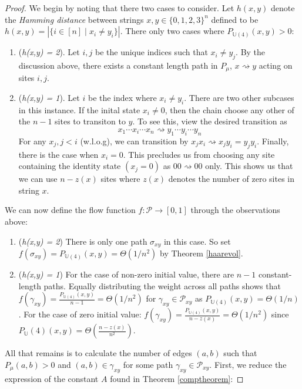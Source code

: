 \documentclass[12pt]{amsart}
\theoremstyle{definition}
\theoremstyle{remark}
\numberwithin{equation}{section}
\theoremstyle{remark}
\begin{document}
\begin{proof}
  We begin by noting that there two cases to consider. Let $h(x,y)$ denote the \emph{Hamming distance} between strings $x,y \in \{0,1,2,3\}^n$ defined to be $h(x,y) = |\{i \in [n] \mid x_i \neq y_i\}|$. There only two cases where $P_{\mathbb{U}(4)}(x,y) > 0$: \newline
  \begin{enumerate}
    \item (\emph{h(x,y) = 2}). Let $i,j$ be the unique indices such that $x_i \neq y_j$. By the discussion above, there exists a constant length path in $P_\mu$, $x \rightsquigarrow y$ acting on sites $i,j$.
    \item (\emph{h(x,y) = 1}). Let $i$ be the index where $x_i \neq y_i$. There are two other subcases in this instance. If the inital state $x_i \neq 0$, then the chain choose any other of the $n-1$ sites to transiton to $y$. To see this, view the desired transition as
    $$x_1 \cdots x_i \cdots x_n \rightsquigarrow y_1 \cdots y_i \cdots y_n$$
    For any $x_j, j < i$ (w.l.o.g), we can transition by $x_jx_i \rightsquigarrow x_jy_i = y_jy_i$. Finally, there is the case when $x_i = 0$. This precludes us from choosing any site containing the identity state $(x_j = 0)$ as $00 \rightsquigarrow 00$ only. This shows us that we can use $n - z(x)$ sites where $z(x)$ denotes the number of zero sites in string $x$.
  \end{enumerate}
  We can now define the flow function $f: \mathcal{P} \rightarrow [0,1]$ through the observations above:
  \begin{enumerate}
    \item (\emph{h(x,y) = 2}) There is only one path $\sigma_{xy}$ in this case. So set $f(\sigma_{xy}) = P_{\mathbb{U}(4)}(x,y) = \Theta(1/n^2)$ by Theorem \ref{haarevol}.
    \item (\emph{h(x,y) = 1}) For the case of non-zero initial value, there are $n-1$ constant-length paths. Equally distributing the weight across all paths shows that $f(\gamma_{xy}) = \frac{P_{\mathbb{U}(4)}(x,y)}{n-1} = \Theta(1/n^2)$ for $\gamma_{xy} \in \mathcal{P}_{xy}$ as $P_{\mathbb{U}(4)}(x,y) = \Theta(1/n)$. For the case of zero initial value: $f(\gamma_{xy}) = \frac{P_{\mathbb{U}(4)}(x,y)}{n-z(x)} = \Theta(1/n^2)$ since ${P_{\mathbb{U}}(4)}(x,y) = \Theta(\frac{n - z(x)}{n^2})$.
  \end{enumerate}
  All that remains is to calculate the number of edges $(a,b)$ such that $P_\mu(a,b) > 0$ and $(a,b) \in \gamma_{xy}$ for some path $\gamma_{xy} \in \mathcal{P}_{xy}$. First, we reduce the expression of the constant $A$ found in Theorem \ref{comptheorem}:

\end{proof}
\end{document}
